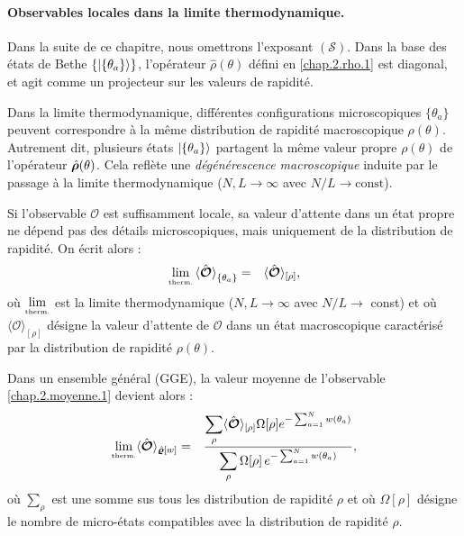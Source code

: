 \paragraph{Observables locales dans la limite thermodynamique.}
Dans la suite de ce chapitre, nous omettrons l’exposant $(\mathcal{S})$.
\vspace{0.2em}
Dans la base des états de Bethe \( \{ \ket{\{ \theta_a \}} \} \), l’opérateur \( \hat{\rho}(\theta) \) défini en \eqref{chap.2.rho.1} est diagonal, et agit comme un projecteur sur les valeurs de rapidité.

\vspace{0.5em}

Dans la limite thermodynamique, différentes configurations microscopiques \( \{ \theta_a \} \) peuvent correspondre à la même distribution de rapidité macroscopique \( \rho(\theta) \). Autrement dit, plusieurs états \( \ket{\{ \theta_a \}} \) partagent la même valeur propre \( \rho(\theta) \) de l’opérateur \( \hat{\bm{\rho}}(\theta) \). Cela reflète une {\em dégénérescence macroscopique} induite par le passage à la limite thermodynamique (\( N, L \to \infty \) avec \( N/L \to \text{const} \)).

\vspace{0.5em}

Si l’observable $\mathcal{O}$ est suffisamment locale, sa valeur d’attente dans un état propre ne dépend pas des détails microscopiques, mais uniquement de la distribution de rapidité. On écrit alors :
\begin{eqnarray}
	\underset{\mbox{\tiny therm.}}{\lim} \braket{  \hat{\bm{\mathcal{O}}} }_{\{ \theta_a\}}  & = & \langle \hat{\bm{\mathcal{O}}}\rangle_{[\rho]},
\end{eqnarray}
où $\underset{\mbox{\tiny therm.}}{\lim}$ est la limite thermodynamique ($N,L \to \infty$ avec $N/L \to $ const) et où \( \langle \mathcal{O} \rangle_{[\rho]} \) désigne la valeur d’attente de \( \mathcal{O} \) dans un état macroscopique caractérisé par la distribution de rapidité \( \rho(\theta) \).


\medskip
Dans un ensemble général (GGE), la valeur moyenne de l’observable \eqref{chap.2.moyenne.1} devient alors :		
\begin{eqnarray}\label{chap.2.moyenne.2}
	\underset{\mbox{\tiny therm.}}{\lim} \langle \hat{\bm{\mathcal{O}}} \rangle_{\hat{\bm{\varrho}}[w]} & =  & \frac{  \displaystyle \sum_{\rho }  \langle \hat{\bm{\mathcal{O}}}\rangle_{[\rho]} \Omega[\rho] e^{- \sum_{a = 1}^N  w(\theta_a)    }}{ \displaystyle \sum_{\rho}   \Omega[\rho]\,e^{- \sum_{a = 1}^N  w(\theta_a) } } ,
\end{eqnarray}
où $\sum_{\rho }$ est une somme sus tous les distribution de rapidité $\rho$ et 
où $\Omega[\rho]$ désigne le nombre de micro-états compatibles avec la distribution de rapidité $\rho$.

